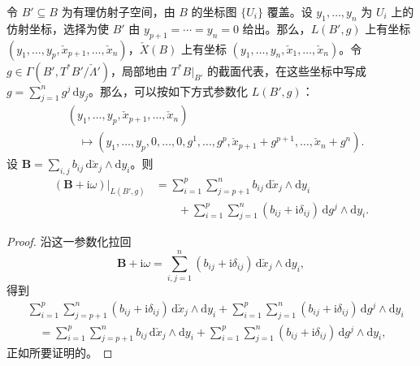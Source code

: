 \begin{lemma}\label{lem:6.67}
令 $B'\subseteq B$ 为有理仿射子空间，由 $B$ 的坐标图 $\{U_i\}$ 覆盖。设 $y_1,\ldots,y_n$ 为 $U_i$ 上的仿射坐标，选择为使 $B'$ 由 $y_{p+1}=\cdots=y_n=0$ 给出。那么，$L(B',g)$ 上有坐标 $(y_1,\ldots,y_p,\check x_{p+1},\ldots,\check x_n)$，$\check X(B)$ 上有坐标 $(y_1,\ldots,y_n,\check x_1,\ldots,\check x_n)$。令 $g\in\Gamma(B',T^*B'/\check\Lambda')$，局部地由 $T^*B|_{B'}$ 的截面代表，在这些坐标中写成 $g=\sum_{j=1}^ng^j\,\mathrm dy_j$。那么，可以按如下方式参数化 $L(B',g)$：
\[
\begin{aligned}
&(y_1,\ldots,y_p,\check x_{p+1},\ldots,\check x_n)\\
&\quad\longmapsto(y_1,\ldots,y_p,0,\ldots,0,
g^1,\ldots,g^p,\check x_{p+1}+g^{p+1},\ldots,\check x_n+g^n).
\end{aligned}
\]
设 $\mathbf B=\sum_{i,j}b_{ij}\,\mathrm d\check x_j\wedge\mathrm dy_i$。则
\[
\begin{aligned}
(\mathbf B+\mathrm i\omega)|_{L(B',g)}
&=\sum_{i=1}^p\sum_{j=p+1}^nb_{ij}\,\mathrm d\check x_j\wedge\mathrm dy_i\\
&\qquad+\sum_{i=1}^p\sum_{j=1}^n(b_{ij}+\mathrm i\delta_{ij})\,
\mathrm dg^j\wedge\mathrm dy_i.
\end{aligned}
\]
\end{lemma}
\begin{proof}
沿这一参数化拉回
\[
\mathbf B+\mathrm i\omega
=\sum_{i,j=1}^n(b_{ij}+\mathrm i\delta_{ij})\,
\mathrm d\check x_j\wedge\mathrm dy_i,
\]
得到
\[
\begin{aligned}
&\sum_{i=1}^p\sum_{j=p+1}^n(b_{ij}+\mathrm i\delta_{ij})\,
\mathrm d\check x_j\wedge\mathrm dy_i
+\sum_{i=1}^p\sum_{j=1}^n(b_{ij}+\mathrm i\delta_{ij})\,
\mathrm dg^j\wedge\mathrm dy_i\\
&\quad=\sum_{i=1}^p\sum_{j=p+1}^nb_{ij}\,\mathrm d\check x_j\wedge\mathrm dy_i
+\sum_{i=1}^p\sum_{j=1}^n(b_{ij}+\mathrm i\delta_{ij})\,
\mathrm dg^j\wedge\mathrm dy_i,
\end{aligned}
\]
正如所要证明的。
\end{proof}

